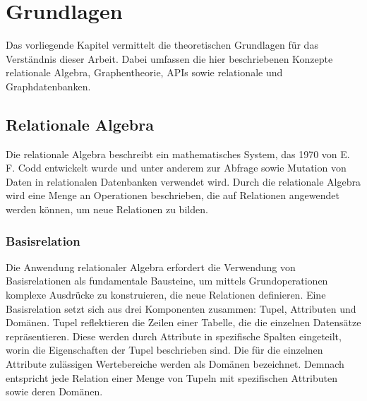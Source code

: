 \chapter{Grundlagen} %
\label{sec:grundlagen}
Das vorliegende Kapitel vermittelt die theoretischen Grundlagen für das Verständnis dieser Arbeit. Dabei umfassen die hier beschriebenen Konzepte relationale Algebra, Graphentheorie, APIs sowie relationale und Graphdatenbanken.
\section{Relationale Algebra} %
\label{sec:relationaleAlgebra}
Die relationale Algebra beschreibt ein mathematisches System, das 1970 von E. F. Codd entwickelt wurde und unter anderem zur Abfrage sowie Mutation von Daten in relationalen Datenbanken verwendet wird. Durch die relationale Algebra wird eine Menge an Operationen beschrieben, die auf Relationen angewendet werden können, um neue Relationen zu bilden.  \citep{relationalModel}

\subsection{Basisrelation} %
\label{sec:basisrelation}
Die Anwendung relationaler Algebra erfordert die Verwendung von Basisrelationen als fundamentale Bausteine, um mittels Grundoperationen komplexe Ausdrücke zu konstruieren, die neue Relationen definieren. Eine Basisrelation setzt sich aus drei Komponenten zusammen: Tupel, Attributen und Domänen. Tupel reflektieren die Zeilen einer Tabelle, die die einzelnen Datensätze repräsentieren. Diese werden durch Attribute in spezifische Spalten eingeteilt, worin die Eigenschaften der Tupel beschrieben sind. Die für die einzelnen Attribute zulässigen Wertebereiche werden als Domänen bezeichnet. Demnach entspricht jede Relation einer Menge von Tupeln mit spezifischen Attributen sowie deren Domänen. \citep{rdb}

